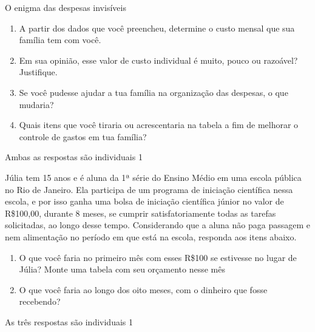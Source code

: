 \begin{task}{O enigma das despesas invisíveis}
\begin{enumerate}
\item A partir dos dados que você preencheu, determine o custo mensal que sua família tem com você.
\item Em sua opinião, esse valor de custo individual é muito, pouco ou razoável? Justifique.
\item Se você pudesse ajudar a tua família na organização das despesas, o que mudaria?
\item Quais itens que você tiraria ou acrescentaria na tabela a fim de melhorar o controle de gastos em tua família?

\end{enumerate}

\end{task}

\clearpage
\practice{}
\begin{resposta}{}
{
  Ambas as respostas são individuais
}{1}
\end{resposta}
\begin{task}{}
Júlia tem 15 anos e é aluna da 1ª série do Ensino Médio em uma escola pública no Rio de Janeiro. Ela participa de um programa de iniciação científica nessa escola, e por isso ganha uma bolsa de iniciação científica júnior no valor de R\$100,00, durante 8 meses, se cumprir satisfatoriamente todas as tarefas solicitadas, ao longo desse tempo. Considerando que a aluna não paga passagem e nem alimentação no período em que está na escola, responda aos itens abaixo.

\begin{enumerate}
\item O que você faria no primeiro mês com esses R\$100 se estivesse no lugar de Júlia? Monte uma tabela com seu orçamento nesse mês
\item O que você faria ao longo dos oito meses, com o dinheiro que fosse recebendo?
\end{enumerate}
\end{task}

\begin{resposta}{}
{
  As três respostas são individuais
}{1}
\end{resposta}

